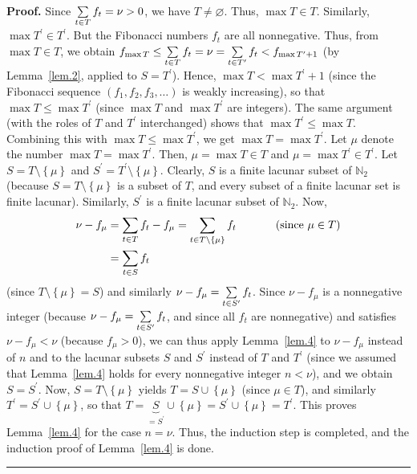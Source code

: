 \documentclass[numbers=enddot,12pt,final,onecolumn,notitlepage]{scrartcl}%
\numberwithin{exer}{section}
\theoremstyle{definition}
\newenvironment{proof}[1][Proof]{\noindent\textbf{#1.} }{\ \rule{0.5em}{0.5em}}
\let\sumnonlimits\sum
\renewcommand{\sum}{\sumnonlimits\limits}
\begin{document}
\begin{proof}
Since $\sum\limits_{t\in T}f_{t}=\nu>0$, we have $T\neq\varnothing$. Thus,
$\max T\in T$. Similarly, $\max T^{\prime}\in T^{\prime}$. But the Fibonacci
numbers $f_{t}$ are all nonnegative. Thus, from $\max T \in T$, we obtain
$f_{\max T}\leq\sum\limits_{t\in T}f_{t}=\nu=\sum\limits_{t\in T^{\prime}%
}f_{t}<f_{\max T^{\prime}+1}$ (by Lemma~\ref{lem.2}, applied to $S=T^{\prime}%
$). Hence, $\max T<\max T^{\prime}+1$ (since the Fibonacci sequence $\left(
f_{1},f_{2},f_{3},\ldots\right)  $ is weakly increasing), so that $\max
T\leq\max T^{\prime}$ (since $\max T$ and $\max T^{\prime}$ are integers). The
same argument (with the roles of $T$ and $T^{\prime}$ interchanged) shows that
$\max T^{\prime}\leq\max T$. Combining this with $\max T\leq\max T^{\prime}$,
we get $\max T=\max T^{\prime}$. Let $\mu$ denote the number $\max T=\max
T^{\prime}$. Then, $\mu=\max T\in T$ and $\mu=\max T^{\prime}\in T^{\prime}$.
Let $S=T\setminus\left\{  \mu\right\}  $ and $S^{\prime}=T^{\prime}%
\setminus\left\{  \mu\right\}  $. Clearly, $S$ is a finite lacunar subset of
$\mathbb{N}_{2}$ (because $S=T\setminus\left\{  \mu\right\}  $ is a subset of
$T$, and every subset of a finite lacunar set is finite lacunar). Similarly,
$S^{\prime}$ is a finite lacunar subset of $\mathbb{N}_{2}$. Now,%
\begin{align*}
\nu-f_{\mu}  &  =\sum\limits_{t\in T}f_{t}-f_{\mu}=\sum\limits_{t\in
T\setminus\left\{  \mu\right\}  }f_{t}\ \ \ \ \ \ \ \ \ \ \left(  \text{since
}\mu\in T\right) \\
&  =\sum\limits_{t\in S}f_{t}%
\end{align*}
(since $T\setminus\left\{  \mu\right\}  =S$) and similarly $\nu-f_{\mu}%
=\sum\limits_{t\in S^{\prime}}f_{t}$. Since $\nu-f_{\mu}$ is a nonnegative
integer (because $\nu-f_{\mu}=\sum\limits_{t\in S^{\prime}}f_{t}$, and since
all $f_{t}$ are nonnegative) and satisfies $\nu-f_{\mu}<\nu$ (because $f_{\mu
}> 0$), we can thus apply Lemma~\ref{lem.4} to $\nu-f_{\mu}$ instead of $n$
and to the lacunar subsets $S$ and $S^{\prime}$ instead of $T$ and $T^{\prime
}$ (since we assumed that Lemma~\ref{lem.4} holds for every nonnegative
integer $n<\nu$), and we obtain $S=S^{\prime}$. Now, $S=T\setminus\left\{
\mu\right\}  $ yields $T=S\cup\left\{  \mu\right\}  $ (since $\mu\in T$), and
similarly $T^{\prime}=S^{\prime}\cup\left\{  \mu\right\}  $, so that
$T=\underbrace{S}_{=S^{\prime}}\cup\left\{  \mu\right\}  =S^{\prime}%
\cup\left\{  \mu\right\}  =T^{\prime}$. This proves Lemma~\ref{lem.4} for the
case $n=\nu$. Thus, the induction step is completed, and the induction proof
of Lemma~\ref{lem.4} is done.
\end{proof}
\end{document}
